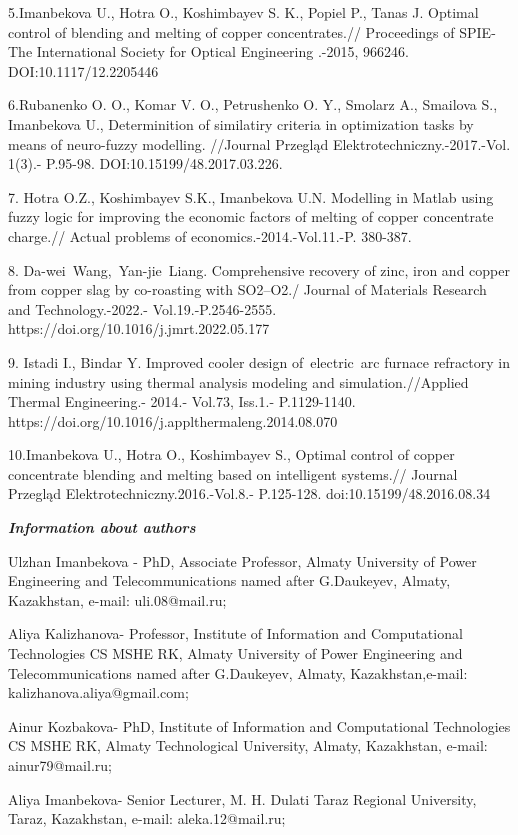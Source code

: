 5.Imanbekova U., Hotra O., Koshimbayev S. K., Popiel P., Tanas J.
Optimal control of blending and melting of copper concentrates.//
Proceedings of SPIE-The International Society for Optical Engineering
.-2015, 966246. DOI:10.1117/12.2205446

6.Rubanenko O. O., Komar V. O., Petrushenko O. Y., Smolarz A., Smailova
S., Imanbekova U., Determinition of similatiry criteria in optimization
tasks by means of neuro-fuzzy modelling. //Journal Przegląd
Elektrotechniczny.-2017.-Vol. 1(3).- P.95-98.
DOI:10.15199/48.2017.03.226.

7. Hotra O.Z., Koshimbayev S.K., Imanbekova U.N. Modelling in Matlab
using fuzzy logic for improving the economic factors of melting of
copper concentrate charge.// Actual problems of
economics.-2014.-Vol.11.-P. 380-387.

8. Da-wei~Wang,~Yan-jie~Liang. Comprehensive recovery of zinc, iron and
copper from copper slag by co-roasting with SO2--O2./ Journal of
Materials Research and Technology.-2022.- Vol.19.-P.2546-2555.
https://doi.org/10.1016/j.jmrt.2022.05.177

9. Istadi I., Bindar Y. Improved cooler design of~electric~arc furnace
refractory in mining industry using thermal analysis modeling and
simulation.//Applied Thermal Engineering.- 2014.- Vol.73, Iss.1.-
P.1129-1140. https://doi.org/10.1016/j.applthermaleng.2014.08.070

10.Imanbekova U., Hotra O., Koshimbayev S., Optimal control of copper
concentrate blending and melting based on intelligent systems.// Journal
Przegląd Elektrotechniczny.2016.-Vol.8.- P.125-128.
doi:10.15199/48.2016.08.34

\emph{{\bfseries Information about authors}}

Ulzhan Imanbekova - PhD, Associate Professor, Almaty University of Power
Engineering and Telecommunications named after G.Daukeyev, Almaty,
Kazakhstan, e-mail: uli.08@mail.ru;

Aliya Kalizhanova- Professor, Institute of Information and Computational
Technologies CS MSHE RK, Almaty University of Power Engineering and
Telecommunications named after G.Daukeyev, Almaty, Kazakhstan,e-mail:
kalizhanova.aliya@gmail.com;

Ainur Kozbakova- PhD, Institute of Information and Computational
Technologies CS MSHE RK, Almaty Technological University, Almaty,
Kazakhstan, e-mail: ainur79@mail.ru;

Aliya Imanbekova- Senior Lecturer, M. H. Dulati Taraz Regional
University, Taraz, Kazakhstan, e-mail: aleka.12@mail.ru;

